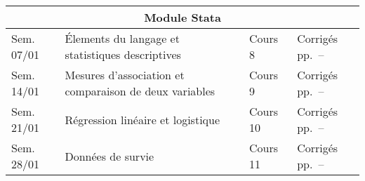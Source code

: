 \documentclass[11pt]{report}
\theoremstyle{definition}
\newcommand{\blankpage}{
  \newpage
  \thispagestyle{empty}
  \mbox{}
  \newpage
  }
\begin{document}
\begin{center}
\begin{tabular}{|l|p{10cm}|l|l|}
\hline
  \multicolumn{4}{|c|}{Module Stata} \\
\hline
  Sem. 07/01 & Élements du langage et statistiques descriptives & Cours 8 &
  Corrigés pp.~\pageref{start:sol1stata}–\pageref{stop:sol1stata}\\
  Sem. 14/01 & Mesures d'association et comparaison de deux variables &
  Cours 9 & Corrigés pp.~\pageref{start:sol2stata}–\pageref{stop:sol2stata}\\
  Sem. 21/01 & Régression linéaire et logistique & Cours 10 & Corrigés pp.~\pageref{start:sol3stata}–\pageref{stop:sol3stata}\\
  Sem. 28/01 & Données de survie & Cours 11 & Corrigés pp.~\pageref{start:sol4stata}–\pageref{stop:sol4stata}\\
\hline
\end{tabular}
\end{center}


\setcounter{page}{1}


\cleardoublepage

\blankpage
\blankpage

\thispagestyle{empty}
\end{document}
